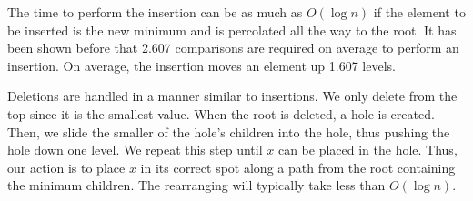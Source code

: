 The time to perform the insertion can be as much as \(O(\log n)\) if the element to be inserted is the new minimum and is percolated all the way to the root. It has been shown before that 2.607 comparisons are required on average to perform an insertion. On average, the insertion moves an element up 1.607 levels.

Deletions are handled in a manner similar to insertions. We only delete from the top since it is the smallest value. When the root is deleted, a hole is created. Then, we slide the smaller of the hole's children into the hole, thus pushing the hole down one level. We repeat this step until \(x\) can be placed in the hole. Thus, our action is to place \(x\) in its correct spot along a path from the root containing the minimum children. The rearranging will typically take less than \(O(\log n)\).

